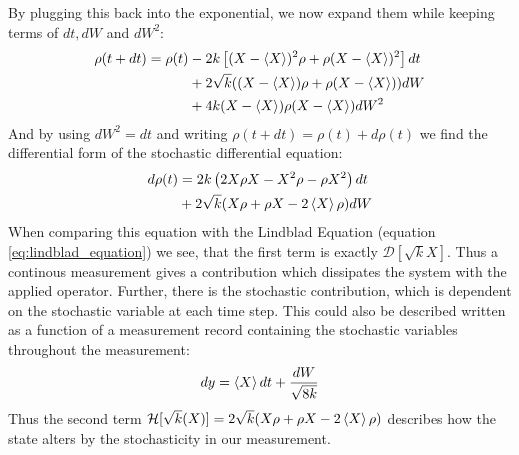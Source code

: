 By plugging this back into the exponential, we now expand them while keeping terms of $dt, dW$ and $dW^2$:
\begin{align*}
    \rho(t+ dt) = \rho(t) &- 2k\left[(X - \expval{X})^2\rho + \rho(X - \expval{X})^2 \right]dt \\
                          &+ 2\sqrt{k}((X -\expval{X})\rho + \rho(X -\expval{X}))dW \\
                          &+ 4k (X -\expval{X})\rho (X -\expval{X}) dW^2
\end{align*}
And by using $dW^2 = dt$ and writing $\rho(t +dt) = \rho(t) + d\rho(t)$ we find the differential form of the stochastic differential equation:
\begin{align}
    d\rho(t) &=  2k\left(2 X\rho X - X^2\rho - \rho X^2\right)dt \\
                          &+ 2\sqrt{k}(X\rho + \rho X - 2 \expval{X}\rho)dW
\end{align}
When comparing this equation with the Lindblad Equation (equation \ref{eq:lindblad_equation}) we see, that the first term is exactly $\mathcal{D}[\sqrt{k}X]$. Thus a continous measurement gives a contribution which dissipates the system with the applied operator. Further, there is the stochastic contribution, which is dependent on the stochastic variable at each time step. This could also be described written as a function of a measurement record containing the stochastic variables throughout the measurement:
\begin{equation}
    dy = \expval{X}dt + \frac{dW}{\sqrt{8k}}
\end{equation}
Thus the second term $\mathcal{H}[\sqrt{k}(X)]=2\sqrt{k}(X\rho + \rho X - 2 \expval{X}\rho)$ describes how the state alters by the stochasticity in our measurement.




